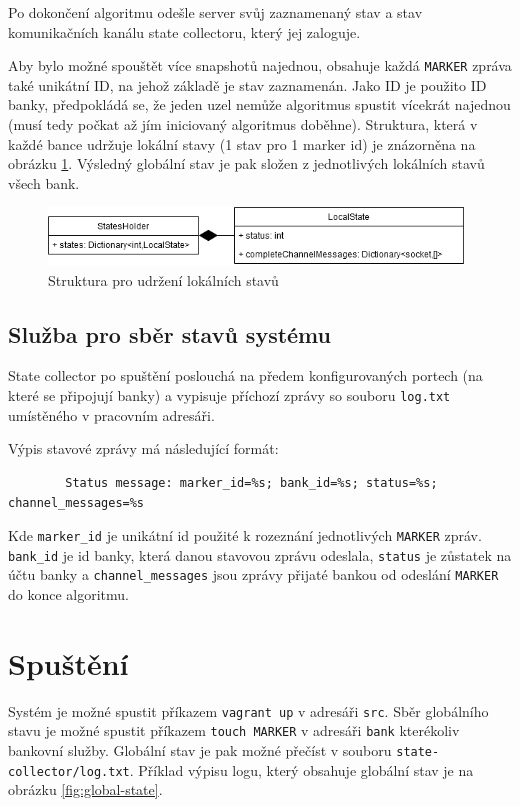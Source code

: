 \documentclass[11pt,a4paper]{scrartcl}
\begin{document}
	Po dokončení algoritmu odešle server svůj zaznamenaný stav a stav komunikačních kanálu state collectoru, který jej zaloguje. 
	
	Aby bylo možné spouštět více snapshotů najednou, obsahuje každá \verb|MARKER| zpráva také unikátní ID, na jehož základě je stav zaznamenán. Jako ID je použito ID banky, předpokládá se, že jeden uzel nemůže algoritmus spustit vícekrát najednou (musí tedy počkat až jím iniciovaný algoritmus doběhne). Struktura, která v každé bance udržuje lokální stavy (1 stav pro 1 marker id) je znázorněna na obrázku \ref{fig:state-holder}. Výsledný globální stav je pak složen z jednotlivých lokálních stavů všech bank.
	
	\begin{figure}[H]
		\centering
		\includegraphics[width=11cm]{img/state-holder.png}
		\caption{Struktura pro udržení lokálních stavů}
		\label{fig:state-holder}
	\end{figure}
	
	\subsection{Služba pro sběr stavů systému}
	State collector po spuštění poslouchá na předem konfigurovaných portech (na které se připojují banky) a vypisuje příchozí zprávy so souboru \verb|log.txt| umístěného v pracovním adresáři.
	
	Výpis stavové zprávy má následující formát:
	
	\begin{verbatim}
		Status message: marker_id=%s; bank_id=%s; status=%s; channel_messages=%s
	\end{verbatim}
	
	Kde \verb|marker_id| je unikátní id použité k rozeznání jednotlivých \verb|MARKER| zpráv. \verb|bank_id| je id banky, která danou stavovou zprávu odeslala, \verb|status| je zůstatek na účtu banky a \verb|channel_messages| jsou zprávy přijaté bankou od odeslání \verb|MARKER| do konce algoritmu.
	
	\section{Spuštění}
	Systém je možné spustit příkazem \verb|vagrant up| v adresáři \verb|src|. Sběr globálního stavu je možné spustit příkazem \verb|touch MARKER| v adresáři \verb|bank| kterékoliv bankovní služby. Globální stav je pak možné přečíst v souboru \verb|state-collector/log.txt|. Příklad výpisu logu, který obsahuje globální stav je na obrázku \ref{fig:global-state}.
	
\end{document}
